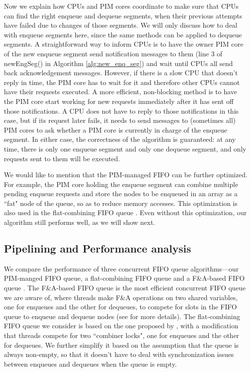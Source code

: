 Now we explain how CPUs and PIM cores coordinate to make sure that CPUs can find the right enqueue 
and dequeue segments, when their previous attempts have failed due to changes of those segments. 
We will only discuss how to deal with enqueue segments here, 
since the same methods can be applied to dequeue segments. 
A straightforward way to inform CPUs is to have the owner PIM core of the new enqueue segment 
send notification messages to them (line 3 of newEngSeg() in Algorithm \ref{alg:new_enq_seg}) 
and wait until CPUs all send back acknowledgement messages. 
However, if there is a slow CPU that doesn't reply in time, 
the PIM core has to wait for it and therefore other CPUs cannot have their requests executed. 
A more efficient, non-blocking method is to have the PIM core start working for new requests 
immediately after it has sent off those notifications. 
A CPU does not have to reply to those notifications in this case, 
but if its request later fails, it needs to send messages to (sometimes all) PIM cores 
to ask whether a PIM core is currently in charge of the enqueue segment.
In either case, the correctness of the algorithm is guaranteed:  
at any time, there is only one enqueue segment and only one dequeue segment, 
and only requests sent to them will be executed. 
  
We would like to mention that the PIM-managed FIFO can be further optimized. 
For example, the PIM core holding the enqueue segment can combine multiple pending enqueue requests 
and store the nodes to be enqueued in an array as a ``fat" node of the queue, 
so as to reduce memory accesses. 
This optimization is also used in the flat-combining FIFO queue \cite{Hendler10}. 
Even without this optimization, our algorithm still performs well, as we will show next. 

\subsection{Pipelining and Performance analysis}
We compare the performance of three concurrent FIFO queue algorithms---our PIM-manged FIFO queue, 
a flat-combining FIFO queue and a F\&A-based FIFO queue \cite{Morrison13}. 
The F\&A-based FIFO queue is the most efficient concurrent FIFO queue we are aware of, 
where threads make F\&A operations on two shared variables, 
one for enqueues and the other for dequeues, to compete for slots in the FIFO queue to 
enqueue and dequeue nodes (see \cite{Morrison13} for more details). 
The flat-combining FIFO queue we consider is based on the one proposed by \cite{Hendler10}, 
with a modification that threads compete for two ``combiner locks", 
one for enqueues and the other for dequeues. 
We further simplify it based on the assumption that the queue is always non-empty, 
so that it doesn't have to deal with synchronization issues between enqueues and dequeues 
when the queue is empty. 

